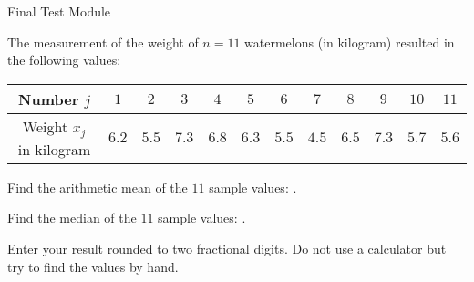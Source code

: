 \begin{MTest}{Final Test Module }
\begin{MExercise}
\end{MExercise}


\begin{MExercise}
The measurement of the weight of $n=11$ watermelons (in kilogram) resulted in the following values:

\begin{center}
\begin{tabular}{|c|c|c|c|c|c|c|c|c|c|c|c|}
\hline
Number $j$ & $1$ & $2$ & $3$ & $4$ & $5$ & $6$ & $7$ & $8$ & $9$ & $10$ & $11$ \\ \hline
Weight $x_j$ in kilogram & $6.2$ &  $5.5$ & $7.3$ & $6.8$ & $6.3$ & $5.5$ & $4.5$ & $6.5$ & $7.3$ & $5.7$ & $5.6$\\ \hline
\end{tabular}
\end{center}

\begin{MExerciseItems}
\item{Find the arithmetic mean of the $11$ sample values: .}
\item{Find the median of the $11$ sample values: .}
\end{MExerciseItems}

Enter your result rounded to two fractional digits. Do not use a calculator but try to find the values by hand.
\end{MExercise}


\end{MTest}

\newpage
\MPrintIndex


